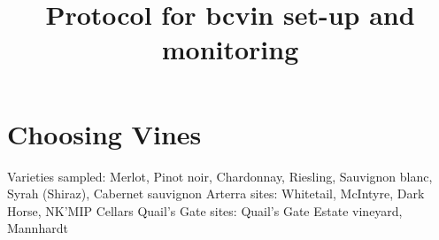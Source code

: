 \documentclass[11pt,letter]{article}
\begin{document}

\renewcommand{\refname}{\CHead{}}

\title{Protocol for bcvin set-up and monitoring}
\date{ }
\maketitle
\tableofcontents


\section{Choosing Vines}

Varieties sampled: Merlot, Pinot noir, Chardonnay, Riesling, Sauvignon blanc, Syrah (Shiraz), Cabernet sauvignon
Arterra sites: Whitetail, McIntyre, Dark Horse, NK'MIP Cellars
Quail's Gate sites: Quail's Gate Estate vineyard, Mannhardt
\end{document}
